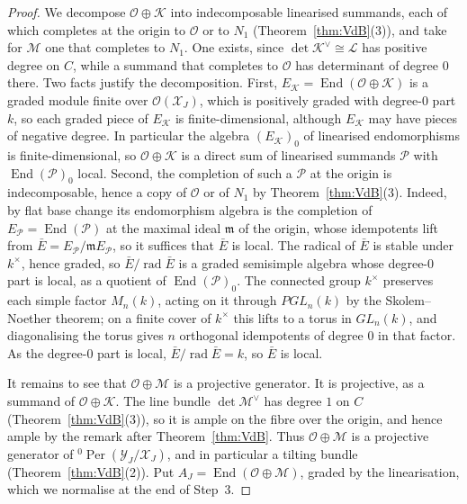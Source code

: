 \documentclass[11pt]{amsart}
\numberwithin{table}{section}
\numberwithin{figure}{section}
\numberwithin{equation}{section}
\theoremstyle{definition}
\theoremstyle{plain}
\newcommand{\cO}{\mathcal{O}}
\newcommand{\cX}{\mathcal{X}}
\newcommand{\cY}{\mathcal{Y}}
\DeclareMathOperator{\End}{End}
\DeclareMathOperator{\Per}{Per}
\begin{document}
\begin{proof}
We decompose $\cO \oplus \mathcal K$ into indecomposable linearised summands, each of which completes at the origin to $\cO$ or to $N_1$ (Theorem~\ref{thm:VdB}(3)), and take for $\mathcal M$ one that completes to $N_1$. One exists, since $\det \mathcal K^\vee \cong \mathcal L$ has positive degree on $C$, while a summand that completes to $\cO$ has determinant of degree $0$ there. Two facts justify the decomposition. First, $E_{\mathcal K} = \End(\cO \oplus \mathcal K)$ is a graded module finite over $\cO(\cX_J)$, which is positively graded with degree-$0$ part $k$, so each graded piece of $E_{\mathcal K}$ is finite-dimensional, although $E_{\mathcal K}$ may have pieces of negative degree. In particular the algebra $(E_{\mathcal K})_0$ of linearised endomorphisms is finite-dimensional, so $\cO \oplus \mathcal K$ is a direct sum of linearised summands $\mathcal P$ with $\End(\mathcal P)_0$ local. Second, the completion of such a $\mathcal P$ at the origin is indecomposable, hence a copy of $\cO$ or of $N_1$ by Theorem~\ref{thm:VdB}(3). Indeed, by flat base change its endomorphism algebra is the completion of $E_{\mathcal P} = \End(\mathcal P)$ at the maximal ideal $\mathfrak m$ of the origin, whose idempotents lift from $\bar E = E_{\mathcal P}/\mathfrak m E_{\mathcal P}$, so it suffices that $\bar E$ is local. The radical of $\bar E$ is stable under $k^\times$, hence graded, so $\bar E/\operatorname{rad}\bar E$ is a graded semisimple algebra whose degree-$0$ part is local, as a quotient of $\End(\mathcal P)_0$. The connected group $k^\times$ preserves each simple factor $M_n(k)$, acting on it through $PGL_n(k)$ by the Skolem--Noether theorem; on a finite cover of $k^\times$ this lifts to a torus in $GL_n(k)$, and diagonalising the torus gives $n$ orthogonal idempotents of degree $0$ in that factor. As the degree-$0$ part is local, $\bar E/\operatorname{rad}\bar E = k$, so $\bar E$ is local.

It remains to see that $\cO \oplus \mathcal M$ is a projective generator. It is projective, as a summand of $\cO \oplus \mathcal K$. The line bundle $\det \mathcal M^\vee$ has degree $1$ on $C$ (Theorem~\ref{thm:VdB}(3)), so it is ample on the fibre over the origin, and hence ample by the remark after Theorem~\ref{thm:VdB}. Thus $\cO \oplus \mathcal M$ is a projective generator of ${}^0\Per(\cY_J/\cX_J)$, and in particular a tilting bundle (Theorem~\ref{thm:VdB}(2)). Put $A_J = \End(\cO \oplus \mathcal M)$, graded by the linearisation, which we normalise at the end of Step~3.


\end{proof}
\end{document}
